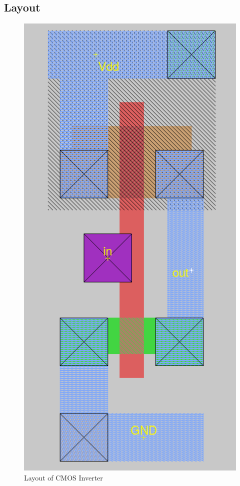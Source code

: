 \documentclass[12pt, a4paper]{article}
\begin{document}
	\subsection{Layout}
	\begin{figure}[H]
		\begin{center}
			\includegraphics[scale = 0.5]{images/layout.png}
			\caption{Layout of CMOS Inverter}
			\label{fig::cmoslayout}
		\end{center}
	\end{figure}
	
\end{document}
